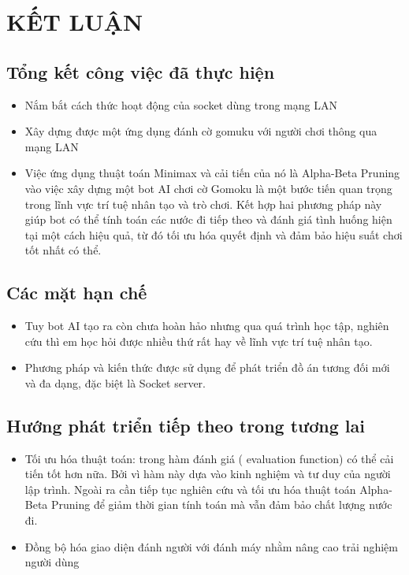 \documentclass[a4paper]{article}
\begin{document}
\section{KẾT LUẬN}
\subsection{Tổng kết công việc đã thực hiện}
\begin{itemize}
    \item Nắm bắt cách thức hoạt động của socket dùng trong mạng LAN
    \item Xây dựng được một ứng dụng đánh cờ gomuku với người chơi thông qua mạng LAN
    \item Việc ứng dụng thuật toán Minimax và cải tiến của nó là Alpha-Beta Pruning vào việc xây dựng một bot AI chơi cờ Gomoku là một bước tiến quan trọng trong lĩnh vực trí tuệ nhân tạo và trò chơi. Kết hợp hai phương pháp này giúp bot có thể tính toán các nước đi tiếp theo và đánh giá tình huống hiện tại một cách hiệu quả, từ đó tối ưu hóa quyết định và đảm bảo hiệu suất chơi tốt nhất có thể. 
\end{itemize}
\subsection{Các mặt hạn chế}
\begin{itemize}
    \item Tuy bot AI tạo ra còn chưa hoàn hảo nhưng qua quá trình học tập, nghiên cứu thì em học hỏi được nhiều thứ rất hay về lĩnh vực trí tuệ nhân tạo.
    \item Phương pháp và kiến thức được sử dụng để phát triển đồ án tương đối mới và đa dạng, đặc biệt là Socket server.
\end{itemize}
\subsection{Hướng phát triển tiếp theo trong tương lai}
\begin{itemize}
    \item Tối ưu hóa thuật toán: trong hàm đánh giá ( evaluation function) có thể cải tiến tốt hơn nữa. Bởi vì hàm này dựa vào kinh nghiệm và tư duy của người lập trình. Ngoài ra cần tiếp tục nghiên cứu và tối ưu hóa thuật toán Alpha-Beta Pruning để giảm thời gian tính toán mà vẫn đảm bảo chất lượng nước đi.
    \item Đồng bộ hóa giao diện đánh người với đánh máy nhằm nâng cao trải nghiệm người dùng
\end{itemize}
\end{document}
